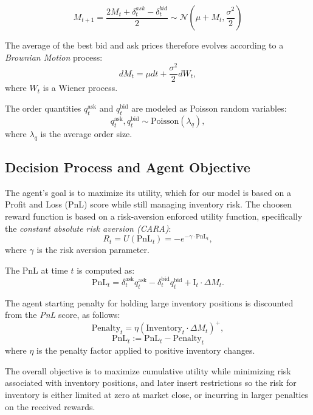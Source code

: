 $$
M_{t+1} = \frac{2M_t + \delta^{ask}_{t} - \delta^{bid}_{t}}{2} 
\sim \mathcal{N}(\mu + M_{t}, \frac{\sigma^2}{2})
$$

The average of the best bid and ask prices therefore evolves according to a \textit{Brownian Motion} process:
$$
dM_t = \mu dt + \frac{\sigma^2}{2} dW_t,
$$
where \( W_t \) is a Wiener process.

The order quantities \( q_t^{\text{ask}} \) and \( q_t^{\text{bid}} \) are modeled as Poisson random variables:
$$
q_t^{\text{ask}}, q_t^{\text{bid}} \sim \text{Poisson}(\lambda_q),
$$
where \( \lambda_q \) is the average order size.

\subsection{Decision Process and Agent Objective}
The agent’s goal is to maximize its utility, which for our model is based on a Profit and Loss (PnL) score while still managing inventory risk. The choosen reward function is based on a risk-aversion enforced utility function, specifically the \textit{constant absolute risk aversion (CARA)}:
$$
R_t = U(\text{PnL}_t) = -e^{-\gamma \cdot \text{PnL}_t},
$$
where \( \gamma \) is the risk aversion parameter.

The PnL at time \( t \) is computed as:
$$
\text{PnL}_t = \delta_t^{\text{ask}} q_t^{\text{ask}} - \delta_t^{\text{bid}} q_t^{\text{bid}} + \text{I}_t \cdot \Delta M_t.
$$

The agent starting penalty for holding large inventory positions  is discounted from the \textit{PnL} score, as follows:
$$
\text{Penalty}_t = \eta \left( \text{Inventory}_t \cdot \Delta M_t \right)^+,
$$
$$
\text{PnL}_t := \text{PnL}_t - \text{Penalty}_t
$$
where \( \eta \) is the penalty factor applied to positive inventory changes.

The overall objective is to maximize cumulative utility while minimizing risk associated with inventory positions, and later insert restrictions so the risk for inventory is either limited at zero at market close, or incurring in larger penalties on the received rewards.